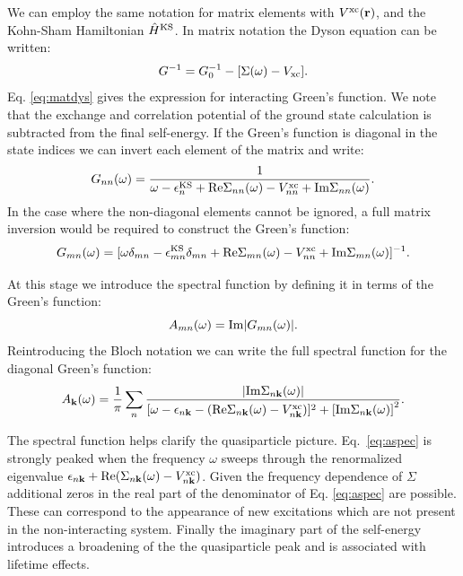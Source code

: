 We can employ the same notation for matrix elements with $V^{\rm{xc}}({\bf r})$,
and the Kohn-Sham Hamiltonian $\hat{H}^{\rm{KS}}$.
%
In matrix notation the Dyson equation \cite{inkson} can be written:
%
\begin{equation}
\label{eq:matdys}
G^{-1} = G_{0}^{-1} - [\Sigma(\omega) - V_{\rm{xc}}].
\end{equation}
%
Eq. \ref{eq:matdys} gives the expression for interacting Green's function.
We note that the exchange and correlation potential of the ground state
calculation is subtracted from the final self-energy. If the Green's function is diagonal
in the state indices we can invert each element of the matrix and write:
%
\begin{equation}
G_{nn}(\omega) = \frac{1}{\omega -\epsilon^{\rm{KS}}_{n}+{\rm Re}\Sigma_{nn}(\omega)-V^{\rm{xc}}_{nn}+{\rm Im}\Sigma_{nn}(\omega)}.
\end{equation}
%
In the case where the non-diagonal elements cannot be ignored,
a full matrix inversion would be required to construct the Green's function:
%
\begin{equation}
G_{mn}(\omega) = [\omega \delta_{mn} - \epsilon^{\rm{KS}}_{mn}\delta_{mn} + {\rm Re}\Sigma_{mn}(\omega) - V^{\rm{xc}}_{nn} + {\rm Im}\Sigma_{mn}(\omega)]^{-1}.
\end{equation}

At this stage we introduce the spectral function by defining it in terms of the Green's function:
%
\begin{equation}
A_{mn}(\omega) = {\rm Im} |G_{mn}(\omega)|.
\end{equation}
%
Reintroducing the Bloch notation we can write the full spectral function
for the diagonal Green's function:
%
\begin{equation}
\label{eq:aspec}
A_{\bf k}(\omega) = \frac{1}{\pi}\sum_{n} \frac{|{\rm Im}\Sigma_{n{\bf k}}(\omega)|}
{[\omega- \epsilon_{n{\bf k}}-({\rm Re}\Sigma_{n{\bf k}}(\omega) -V^{\rm{xc}}_{n{\bf k}})]^{2} + \left[{\rm Im}\Sigma_{n{\bf k}}(\omega)\right]^{2}}.
\end{equation}

The spectral function helps clarify the quasiparticle picture. Eq.~\ref{eq:aspec} is strongly
peaked when the frequency $\omega$ sweeps through the renormalized
eigenvalue $\epsilon_{n{\bf k}} + {\rm Re}(\Sigma_{n{\bf k}}(\omega) - V^{\rm{xc}}_{n{\bf k}}) $. Given
the frequency dependence of $\Sigma$ additional zeros in the real part of the
denominator of Eq. \ref{eq:aspec} are possible. These can correspond to the
appearance of new excitations which are not present in the non-interacting system. Finally
the imaginary part of the self-energy introduces a broadening of the the quasiparticle peak
and is associated with lifetime effects.

